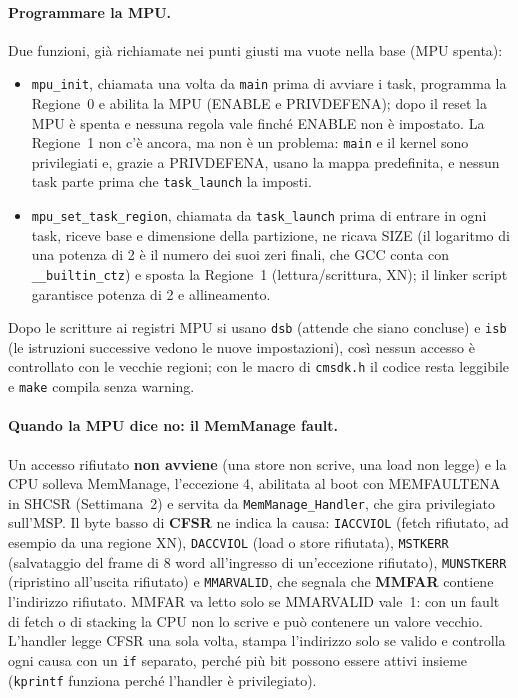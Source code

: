 \paragraph*{Programmare la MPU.}
Due funzioni, già richiamate nei punti giusti ma vuote nella base (MPU spenta):
\begin{itemize}
  \item \texttt{mpu\_init}, chiamata una volta da \texttt{main} prima di avviare i task,
    programma la Regione~0 e abilita la MPU (ENABLE e PRIVDEFENA); dopo il reset la MPU è spenta
    e nessuna regola vale finché ENABLE non è impostato. La Regione~1 non c'è ancora, ma non è
    un problema: \texttt{main} e il kernel sono privilegiati e, grazie a PRIVDEFENA, usano la
    mappa predefinita, e nessun task parte prima che \texttt{task\_launch} la imposti.
  \item \texttt{mpu\_set\_task\_region}, chiamata da \texttt{task\_launch} prima di entrare in
    ogni task, riceve base e dimensione della partizione, ne ricava SIZE (il logaritmo di una
    potenza di 2 è il numero dei suoi zeri finali, che GCC conta con \texttt{\_\_builtin\_ctz})
    e sposta la Regione~1 (lettura/scrittura, XN); il linker script garantisce potenza di 2 e
    allineamento.
\end{itemize}
Dopo le scritture ai registri MPU si usano \texttt{dsb} (attende che siano concluse) e
\texttt{isb} (le istruzioni successive vedono le nuove impostazioni), così nessun accesso è
controllato con le vecchie regioni; con le macro di \texttt{cmsdk.h} il codice resta leggibile e
\texttt{make} compila senza warning.

\paragraph*{Quando la MPU dice no: il MemManage fault.}
Un accesso rifiutato \textbf{non avviene} (una store non scrive, una load non legge) e la CPU
solleva MemManage, l'eccezione 4, abilitata al boot con MEMFAULTENA in SHCSR (Settimana~2) e
servita da \texttt{MemManage\_Handler}, che gira privilegiato sull'MSP. Il byte basso di
\textbf{CFSR} ne indica la causa: \texttt{IACCVIOL} (fetch rifiutato, ad esempio da una regione
XN), \texttt{DACCVIOL} (load o store rifiutata), \texttt{MSTKERR} (salvataggio del frame di
8 word all'ingresso di un'eccezione rifiutato), \texttt{MUNSTKERR} (ripristino all'uscita
rifiutato) e \texttt{MMARVALID}, che segnala che \textbf{MMFAR} contiene l'indirizzo rifiutato.
MMFAR va letto solo se MMARVALID vale~1: con un fault di fetch o di stacking la CPU non lo
scrive e può contenere un valore vecchio. L'handler legge CFSR una sola volta, stampa
l'indirizzo solo se valido e controlla ogni causa con un \texttt{if} separato, perché più bit
possono essere attivi insieme (\texttt{kprintf} funziona perché l'handler è privilegiato).

